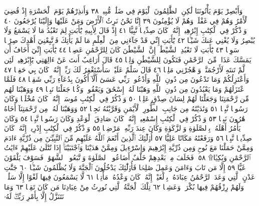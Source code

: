 وَأَبْصِرْ يَوْمَ يَأْتُونَنَا لَٰكِنِ ٱلظَّٰلِمُونَ ٱلْيَوْمَ فِي ضَلَٰلࣲ مُّبِينࣲ ٣٨
وَأَنذِرْهُمْ يَوْمَ ٱلْحَسْرَةِ إِذْ قُضِيَ ٱلْأَمْرُ وَهُمْ فِي غَفْلَةࣲ وَهُمْ لَا
يُؤْمِنُونَ ٣٩ إِنَّا نَحْنُ نَرِثُ ٱلْأَرْضَ وَمَنْ عَلَيْهَا وَإِلَيْنَا يُرْجَعُونَ ٤٠
وَٱذْكُرْ فِي ٱلْكِتَٰبِ إِبْرَٰهِيمَۚ إِنَّهُۥ كَانَ صِدِّيقࣰا نَّبِيًّا ٤١ إِذْ قَالَ لِأَبِيهِ
يَٰٓأَبَتِ لِمَ تَعْبُدُ مَا لَا يَسْمَعُ وَلَا يُبْصِرُ وَلَا يُغْنِي عَنكَ شَيْـࣰٔا ٤٢
يَٰٓأَبَتِ إِنِّي قَدْ جَآءَنِي مِنَ ٱلْعِلْمِ مَا لَمْ يَأْتِكَ فَٱتَّبِعْنِيٓ أَهْدِكَ صِرَٰطࣰا
سَوِيࣰّا ٤٣ يَٰٓأَبَتِ لَا تَعْبُدِ ٱلشَّيْطَٰنَۖ إِنَّ ٱلشَّيْطَٰنَ كَانَ لِلرَّحْمَٰنِ
عَصِيࣰّا ٤٤ يَٰٓأَبَتِ إِنِّيٓ أَخَافُ أَن يَمَسَّكَ عَذَابࣱ مِّنَ ٱلرَّحْمَٰنِ
فَتَكُونَ لِلشَّيْطَٰنِ وَلِيࣰّا ٤٥ قَالَ أَرَاغِبٌ أَنتَ عَنْ ءَالِهَتِي
يَٰٓإِبْرَٰهِيمُۖ لَئِن لَّمْ تَنتَهِ لَأَرْجُمَنَّكَۖ وَٱهْجُرْنِي مَلِيࣰّا ٤٦ قَالَ
سَلَٰمٌ عَلَيْكَۖ سَأَسْتَغْفِرُ لَكَ رَبِّيٓۖ إِنَّهُۥ كَانَ بِي حَفِيࣰّا ٤٧
وَأَعْتَزِلُكُمْ وَمَا تَدْعُونَ مِن دُونِ ٱللَّهِ وَأَدْعُوا۟ رَبِّي عَسَىٰٓ أَلَّآ
أَكُونَ بِدُعَآءِ رَبِّي شَقِيࣰّا ٤٨ فَلَمَّا ٱعْتَزَلَهُمْ وَمَا يَعْبُدُونَ مِن
دُونِ ٱللَّهِ وَهَبْنَا لَهُۥٓ إِسْحَٰقَ وَيَعْقُوبَۖ وَكُلࣰّا جَعَلْنَا نَبِيࣰّا ٤٩
وَوَهَبْنَا لَهُم مِّن رَّحْمَتِنَا وَجَعَلْنَا لَهُمْ لِسَانَ صِدْقٍ عَلِيࣰّا ٥٠
وَٱذْكُرْ فِي ٱلْكِتَٰبِ مُوسَىٰٓۚ إِنَّهُۥ كَانَ مُخْلَصࣰا وَكَانَ رَسُولࣰا نَّبِيࣰّا ٥١
وَنَٰدَيْنَٰهُ مِن جَانِبِ ٱلطُّورِ ٱلْأَيْمَنِ وَقَرَّبْنَٰهُ نَجِيࣰّا ٥٢ وَوَهَبْنَا لَهُۥ مِن
رَّحْمَتِنَآ أَخَاهُ هَٰرُونَ نَبِيࣰّا ٥٣ وَٱذْكُرْ فِي ٱلْكِتَٰبِ إِسْمَٰعِيلَۚ إِنَّهُۥ كَانَ
صَادِقَ ٱلْوَعْدِ وَكَانَ رَسُولࣰا نَّبِيࣰّا ٥٤ وَكَانَ يَأْمُرُ أَهْلَهُۥ بِٱلصَّلَوٰةِ
وَٱلزَّكَوٰةِ وَكَانَ عِندَ رَبِّهِۦ مَرْضِيࣰّا ٥٥ وَٱذْكُرْ فِي ٱلْكِتَٰبِ إِدْرِيسَۚ إِنَّهُۥ
كَانَ صِدِّيقࣰا نَّبِيࣰّا ٥٦ وَرَفَعْنَٰهُ مَكَانًا عَلِيًّا ٥٧ أُو۟لَٰٓئِكَ ٱلَّذِينَ أَنْعَمَ
ٱللَّهُ عَلَيْهِم مِّنَ ٱلنَّبِيِّـۧنَ مِن ذُرِّيَّةِ ءَادَمَ وَمِمَّنْ حَمَلْنَا مَعَ نُوحࣲ وَمِن
ذُرِّيَّةِ إِبْرَٰهِيمَ وَإِسْرَٰٓءِيلَ وَمِمَّنْ هَدَيْنَا وَٱجْتَبَيْنَآۚ إِذَا تُتْلَىٰ عَلَيْهِمْ
ءَايَٰتُ ٱلرَّحْمَٰنِ  وَبُكِيࣰّا۩ ٥٨۞ فَخَلَفَ مِنۢ بَعْدِهِمْ
خَلْفٌ أَضَاعُوا۟ ٱلصَّلَوٰةَ وَٱتَّبَعُوا۟ ٱلشَّهَوَٰتِۖ فَسَوْفَ يَلْقَوْنَ غَيًّا ٥٩
إِلَّا مَن تَابَ وَءَامَنَ وَعَمِلَ صَٰلِحࣰا فَأُو۟لَٰٓئِكَ يَدْخُلُونَ ٱلْجَنَّةَ
وَلَا يُظْلَمُونَ شَيْـࣰٔا ٦٠ جَنَّٰتِ عَدْنٍ ٱلَّتِي وَعَدَ ٱلرَّحْمَٰنُ عِبَادَهُۥ
بِٱلْغَيْبِۚ إِنَّهُۥ كَانَ وَعْدُهُۥ مَأْتِيࣰّا ٦١ لَّا يَسْمَعُونَ فِيهَا لَغْوًا إِلَّا
سَلَٰمࣰاۖ وَلَهُمْ رِزْقُهُمْ فِيهَا بُكْرَةࣰ وَعَشِيࣰّا ٦٢ تِلْكَ ٱلْجَنَّةُ ٱلَّتِي
نُورِثُ مِنْ عِبَادِنَا مَن كَانَ تَقِيࣰّا ٦٣ وَمَا نَتَنَزَّلُ إِلَّا بِأَمْرِ رَبِّكَۖ لَهُۥ
